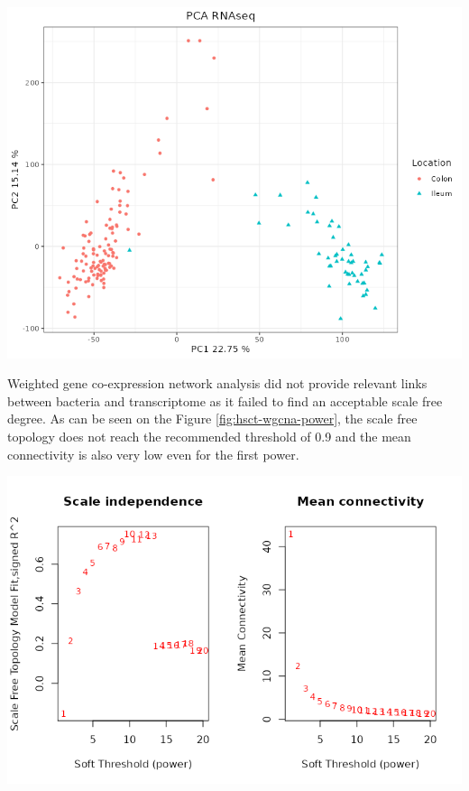 \documentclass[
  12pt,
  a4paper,
  twoside,
  openright]{book}
\let\origfigure\figure
\let\endorigfigure\endfigure
\renewenvironment{figure}[1][2] {
    \expandafter\origfigure\expandafter[!htp]
} {
    \endorigfigure
}
\begin{document}
\begin{figure}
\includegraphics[width=1\linewidth]{images/HSCT_PCA_RNAseq} \caption[PCA of RNAseq data of the HSCT dataset.]{PCA of the RNAseq data of the HSCT dataset. Samples colored by location of the segment. The samples separate according to the location.}\label{fig:hsct-pca-rnaseq}
\end{figure}

Weighted gene co-expression network analysis did not provide relevant links between bacteria and transcriptome as it failed to find an acceptable scale free degree.
As can be seen on the Figure \ref{fig:hsct-wgcna-power}, the scale free topology does not reach the recommended threshold of 0.9 and the mean connectivity is also very low even for the first power.

\begin{figure}
\includegraphics[width=1\linewidth]{images/hsct-wgcna-power} \caption[Power evaluation of WGCNA of the HSCT dataset.]{Power evaluation of WGCNA of the HSCT dataset. On the ordinate the power on the abscissa on the left the scale free topology model fit; on the right the mean connectivity. There is a low fit even on large power and the mean connectivity is below 100 from the very first value.}\label{fig:hsct-wgcna-power}
\end{figure}
\end{document}

